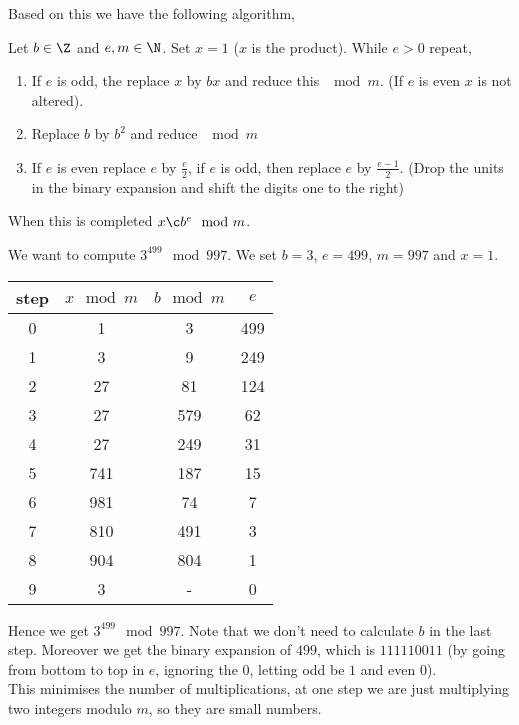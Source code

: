 Based on this we have the following algorithm,
\begin{algorithm}
  Let $b \in \Z$ and $e, m \in \N$. Set $x = 1$ ($x$ is the product). While $e > 0$ repeat,
  \begin{enumerate}
    \item If $e$ is odd, the replace $x$ by $bx$ and reduce this $\mod m$. (If $e$ is even $x$ is not altered).
    \item Replace $b$ by $b^2$ and reduce $\mod m$
    \item If $e$ is even replace $e$ by $\frac{e}{2}$, if $e$ is odd, then replace $e$ by $\frac{e - 1}{2}$. (Drop the units in the binary expansion and shift the digits one to the right)
  \end{enumerate}
  When this is completed $x \c b^e \mod m$.
\end{algorithm}
\newpage
\begin{eg}
  We want to compute $3^{499}\mod 997$. We set $b = 3$, $e = 499$, $m = 997$ and $x = 1$.
\begin{table}[!ht]
\centering
\begin{tabular}{c|c|c|c}
step & $x\mod m$ & $b\mod m$ & $e$   \\\hline
0    & 1         & 3       & 499 \\
1    & 3         & 9       & 249   \\
2   &  27        & 81       & 124 \\
3   &  27        & 579       & 62 \\
4   &  27        & 249       & 31 \\
5   &  741       & 187       & 15 \\
6   &  981        & 74       & 7 \\
7   &  810        & 491       & 3 \\
8   &  904        & 804       & 1 \\
9   &  3        & -       & 0 \\
\end{tabular}%
\end{table}
Hence we get $3^{499}\mod 997$. Note that we don't need to calculate $b$ in the last step. Moreover we get the binary expansion of $499$, which is $111110011$ (by going from bottom to top in $e$, ignoring the $0$, letting odd be $1$ and even $0$).\\
This minimises the number of multiplications, at one step we are just multiplying two integers modulo $m$, so they are small numbers.
\end{eg}

